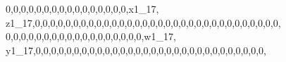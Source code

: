 \documentclass[]{article}
\newenvironment{Shaded}{\begin{snugshade}}{\end{snugshade}}
\newcommand{\DecValTok}[1]{\textcolor[rgb]{0.00,0.00,0.81}{#1}}
\newcommand{\NormalTok}[1]{#1}
\begin{document}
\begin{Shaded}
\begin{Highlighting}[]
\DecValTok{0}\NormalTok{,}\DecValTok{0}\NormalTok{,}\DecValTok{0}\NormalTok{,}\DecValTok{0}\NormalTok{,}\DecValTok{0}\NormalTok{,}\DecValTok{0}\NormalTok{,}\DecValTok{0}\NormalTok{,}\DecValTok{0}\NormalTok{,}\DecValTok{0}\NormalTok{,}\DecValTok{0}\NormalTok{,}\DecValTok{0}\NormalTok{,}\DecValTok{0}\NormalTok{,}\DecValTok{0}\NormalTok{,}\DecValTok{0}\NormalTok{,}\DecValTok{0}\NormalTok{,}\DecValTok{0}\NormalTok{,x1_}\DecValTok{17}\NormalTok{, z1_}\DecValTok{17}\NormalTok{,}\DecValTok{0}\NormalTok{,}\DecValTok{0}\NormalTok{,}\DecValTok{0}\NormalTok{,}\DecValTok{0}\NormalTok{,}\DecValTok{0}\NormalTok{,}\DecValTok{0}\NormalTok{,}\DecValTok{0}\NormalTok{,}\DecValTok{0}\NormalTok{,}\DecValTok{0}\NormalTok{,}\DecValTok{0}\NormalTok{,}\DecValTok{0}\NormalTok{,}\DecValTok{0}\NormalTok{,}\DecValTok{0}\NormalTok{,}\DecValTok{0}\NormalTok{,}\DecValTok{0}\NormalTok{,}\DecValTok{0}\NormalTok{,}\DecValTok{0}\NormalTok{,}\DecValTok{0}\NormalTok{,}\DecValTok{0}\NormalTok{,}\DecValTok{0}\NormalTok{,}\DecValTok{0}\NormalTok{,}\DecValTok{0}\NormalTok{,}\DecValTok{0}\NormalTok{,}\DecValTok{0}\NormalTok{,}\DecValTok{0}\NormalTok{,}\DecValTok{0}\NormalTok{,}\DecValTok{0}\NormalTok{,}\DecValTok{0}\NormalTok{,}\DecValTok{0}\NormalTok{,}\DecValTok{0}\NormalTok{,}\DecValTok{0}\NormalTok{,}\DecValTok{0}\NormalTok{,}
\DecValTok{0}\NormalTok{,}\DecValTok{0}\NormalTok{,}\DecValTok{0}\NormalTok{,}\DecValTok{0}\NormalTok{,}\DecValTok{0}\NormalTok{,}\DecValTok{0}\NormalTok{,}\DecValTok{0}\NormalTok{,}\DecValTok{0}\NormalTok{,}\DecValTok{0}\NormalTok{,}\DecValTok{0}\NormalTok{,}\DecValTok{0}\NormalTok{,}\DecValTok{0}\NormalTok{,}\DecValTok{0}\NormalTok{,}\DecValTok{0}\NormalTok{,}\DecValTok{0}\NormalTok{,}\DecValTok{0}\NormalTok{,}\DecValTok{0}\NormalTok{,}\DecValTok{0}\NormalTok{,w1_}\DecValTok{17}\NormalTok{, y1_}\DecValTok{17}\NormalTok{,}\DecValTok{0}\NormalTok{,}\DecValTok{0}\NormalTok{,}\DecValTok{0}\NormalTok{,}\DecValTok{0}\NormalTok{,}\DecValTok{0}\NormalTok{,}\DecValTok{0}\NormalTok{,}\DecValTok{0}\NormalTok{,}\DecValTok{0}\NormalTok{,}\DecValTok{0}\NormalTok{,}\DecValTok{0}\NormalTok{,}\DecValTok{0}\NormalTok{,}\DecValTok{0}\NormalTok{,}\DecValTok{0}\NormalTok{,}\DecValTok{0}\NormalTok{,}\DecValTok{0}\NormalTok{,}\DecValTok{0}\NormalTok{,}\DecValTok{0}\NormalTok{,}\DecValTok{0}\NormalTok{,}\DecValTok{0}\NormalTok{,}\DecValTok{0}\NormalTok{,}\DecValTok{0}\NormalTok{,}\DecValTok{0}\NormalTok{,}\DecValTok{0}\NormalTok{,}\DecValTok{0}\NormalTok{,}\DecValTok{0}\NormalTok{,}\DecValTok{0}\NormalTok{,}\DecValTok{0}\NormalTok{,}\DecValTok{0}\NormalTok{,}\DecValTok{0}\NormalTok{,}\DecValTok{0}\NormalTok{,}

\end{Highlighting}
\end{Shaded}
\end{document}
